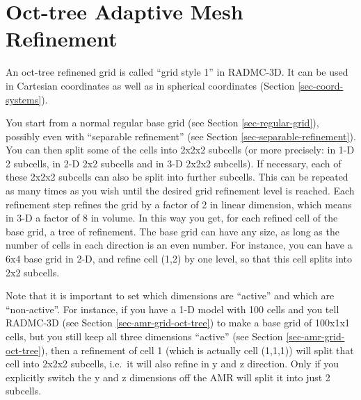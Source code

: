 \documentclass{report}
\begin{document}
\section{Oct-tree Adaptive Mesh Refinement}
\label{sec-oct-tree-amr}
%
An oct-tree refinened grid is called ``grid style 1'' in RADMC-3D. It can be
used in Cartesian coordinates as well as in spherical coordinates (Section
\ref{sec-coord-systems}). 

You start from a normal regular base grid (see Section
\ref{sec-regular-grid}), possibly even with ``separable refinement'' (see
Section \ref{sec-separable-refinement}). You can then split some of the cells
into 2x2x2 subcells (or more precisely: in 1-D 2 subcells, in 2-D 2x2
subcells and in 3-D 2x2x2 subcells). If necessary, each of these 2x2x2
subcells can also be split into further subcells. This can be repeated as
many times as you wish until the desired grid refinement level is reached.
Each refinement step refines the grid by a factor of 2 in linear dimension,
which means in 3-D a factor of 8 in volume. In this way you get, for each
refined cell of the base grid, a tree of refinement. The base grid can have
any size, as long as the number of cells in each direction is an even
number. For instance, you can have a 6x4 base grid in 2-D, and refine cell
(1,2) by one level, so that this cell splits into 2x2 subcells.

Note that it is important to set which dimensions are ``active'' and which
are ``non-active''. For instance, if you have a 1-D model with 100 cells and
you tell RADMC-3D (see Section \ref{sec-amr-grid-oct-tree}) to make a base
grid of 100x1x1 cells, but you still keep all three dimensions ``active''
(see Section \ref{sec-amr-grid-oct-tree}), then a refinement of cell 1
(which is actually cell (1,1,1)) will split that cell into 2x2x2 subcells,
i.e.\ it will also refine in y and z direction. Only if you explicitly
switch the y and z dimensions off the AMR will split it into just 2
subcells.
\end{document}
